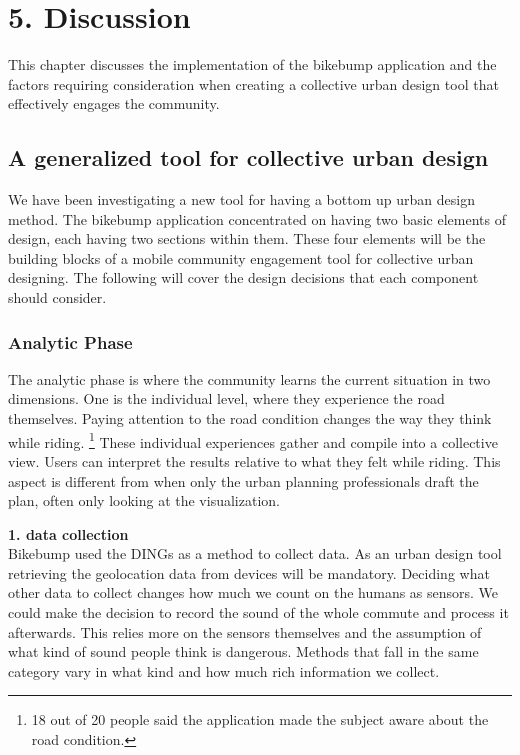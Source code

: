 \chapter{5. Discussion}

This chapter discusses the implementation of the bikebump application and the
factors requiring consideration when creating a collective urban design tool
that effectively engages the community.

\section{A generalized tool for collective urban design}
We have been investigating a new tool for having a bottom up urban design method.
The bikebump application concentrated on having two basic elements of design,
each having two sections within them. These four elements will be the building blocks
of a mobile community engagement tool for collective urban designing.
The following will cover the design decisions that each component should consider.

\subsection{Analytic Phase}
The analytic phase is where the community learns the current situation in two dimensions. One is the individual level, where they experience the road themselves. Paying attention to the road condition changes the way they think while riding.
\footnote{18 out of 20 people said the application made the subject aware about the road condition.}
These individual experiences gather and compile into a collective view. Users can interpret the results relative to what they felt while riding. This aspect is different from when only the urban planning professionals draft the plan, often only looking at the visualization.

\textbf{1. data collection} \\
Bikebump used the DINGs as a method to collect data. As an urban design tool retrieving the geolocation data from devices will be mandatory. Deciding what other data to collect changes how much
we count on the humans as sensors. We could make the decision to record the sound of the whole commute and process it afterwards. This relies more on the sensors themselves and the assumption of what kind of sound people think is dangerous. Methods that fall in the same category vary in what kind and how much rich information we collect.

